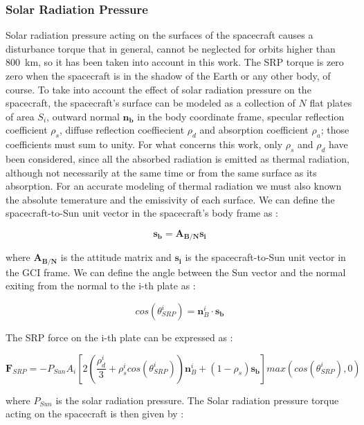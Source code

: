 \documentclass[11pt,a4paper]{report}
\begin{document}
\subsubsection{Solar Radiation Pressure}
Solar radiation pressure acting on the surfaces of the spacecraft causes a disturbance torque that in general, cannot be neglected for orbits higher than \SI{800}{\kilo\meter}, so it has been taken into account in this work.
The SRP torque is zero zero when the spacecraft is in the shadow of the Earth or any other body, of course.
To take into account the effect of solar radiation pressure on the spacecraft, the spacecraft's surface can be modeled as a collection of $N$ flat plates of area $S_{i}$, outward normal $\mathbf{n_{b}}$ in the body coordinate frame, specular reflection coefficient $\rho_s$, diffuse reflection coeffiecient $\rho_{d}$ and absorption coefficient $\rho_{a}$; those coefficients must sum to unity.
For what concerns this work, only $\rho_s$ and $\rho_d$ have been considered, since all the absorbed radiation is emitted as thermal radiation,  although not necessarily at the same time or from the same surface as its absorption.
For an accurate modeling of thermal radiation we must also known the absolute temerature and the emissivity of each surface.
We can define the spacecraft-to-Sun unit vector in the spacecraft's body frame as : 

\begin{equation}
 \mathbf{s_b} = \mathbf{A_{B/N}} \mathbf{s_i}
\end{equation}

where $\mathbf{A_{B/N}}$ is the attitude matrix and $\mathbf{s_i}$ is the spacecraft-to-Sun unit vector in the GCI frame.
We can define the angle between the Sun vector and the normal exiting from the normal to the i-th plate as : 

\begin{equation}
 cos(\theta_{SRP}^{i}) = \mathbf{n}_{B}^{i} \cdot \mathbf{s_b}
\end{equation}

The SRP force on the i-th plate can be expressed as : 

\begin{equation}
 \mathbf{F}_{SRP} = - P_{Sun}A_{i}\left[ 2\left( \frac{\rho_{d}^{i}}{3} + \rho_{s}^{i}cos(\theta_{SRP}^{i}) \right) \mathbf{n}_{B}^{i} + (1 -\rho_{s}) \mathbf{s_b} \right] max(cos(\theta_{SRP}^{i}),0)
\end{equation}

where $P_{Sun}$ is the solar radiation pressure.
The Solar radiation pressure torque acting on the spacecraft is then given by :
\end{document}

